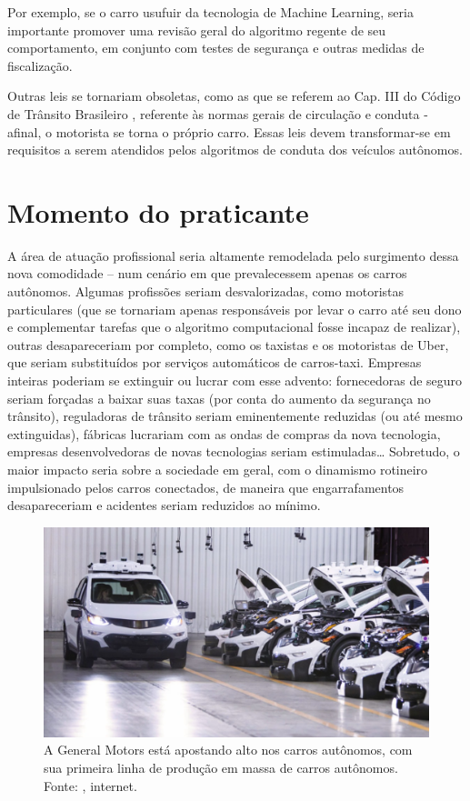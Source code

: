 \documentclass[12pt]{article}
\begin{document}
		Por exemplo, se o carro usufuir da tecnologia de Machine Learning, seria importante promover uma revisão geral do algoritmo regente de seu comportamento, em conjunto com testes de segurança e outras medidas de fiscalização.
		
		Outras leis se tornariam obsoletas, como as que se referem ao Cap. III do Código de Trânsito Brasileiro \citep{congresso_nacional_lei_1997}, referente às normas gerais de circulação e conduta - afinal, o motorista se torna o próprio carro. Essas leis devem transformar-se em requisitos a serem atendidos pelos algoritmos de conduta dos veículos autônomos.
			
		
	\section{\label{praticante}Momento do praticante}
	
		A área de atuação profissional seria altamente remodelada pelo surgimento dessa nova comodidade – num cenário em que prevalecessem apenas os carros autônomos. Algumas profissões seriam desvalorizadas, como motoristas particulares (que se tornariam apenas responsáveis por levar o carro até seu dono e complementar tarefas que o algoritmo computacional fosse incapaz de realizar), outras desapareceriam por completo, como os taxistas e os motoristas de Uber, que seriam substituídos por serviços automáticos de carros-taxi. Empresas inteiras poderiam se extinguir ou lucrar com esse advento: fornecedoras de seguro seriam forçadas a baixar suas taxas (por conta do aumento da segurança no trânsito), reguladoras de trânsito seriam eminentemente reduzidas (ou até mesmo extinguidas), fábricas lucrariam com as ondas de compras da nova tecnologia, empresas desenvolvedoras de novas tecnologias seriam estimuladas… Sobretudo, o maior impacto seria sobre a sociedade em geral, com o dinamismo rotineiro impulsionado pelos carros conectados, de maneira que engarrafamentos desapareceriam e acidentes seriam reduzidos ao mínimo.
		
		\begin{figure}[ht]
			\centering
			\includegraphics[width=.9\textwidth]{producao-carros.jpg}
			\caption{A General Motors está apostando alto nos carros autônomos, com sua primeira linha de produção em massa de carros autônomos. Fonte: \citet{stylo_urbano_gm_nodate}, internet. }\label{fig:4}
		\end{figure}
		
\end{document}
